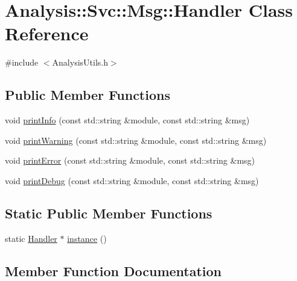 \hypertarget{classAnalysis_1_1Svc_1_1Msg_1_1Handler}{}\section{Analysis\+:\+:Svc\+:\+:Msg\+:\+:Handler Class Reference}
\label{classAnalysis_1_1Svc_1_1Msg_1_1Handler}


{\ttfamily \#include $<$Analysis\+Utils.\+h$>$}

\subsection*{Public Member Functions}
\begin{DoxyCompactItemize}
\item 
void \hyperlink{classAnalysis_1_1Svc_1_1Msg_1_1Handler_aea8aa6f9976b2c76e38afcfc5d1181cf}{print\+Info} (const std\+::string \&module, const std\+::string \&msg)
\item 
void \hyperlink{classAnalysis_1_1Svc_1_1Msg_1_1Handler_a4943dea3cf30fba1d6fcbc1b2cccd488}{print\+Warning} (const std\+::string \&module, const std\+::string \&msg)
\item 
void \hyperlink{classAnalysis_1_1Svc_1_1Msg_1_1Handler_a81a3d00ba9162b45f494218c49f2d354}{print\+Error} (const std\+::string \&module, const std\+::string \&msg)
\item 
void \hyperlink{classAnalysis_1_1Svc_1_1Msg_1_1Handler_a90dbb23013b497eabc605523e1479500}{print\+Debug} (const std\+::string \&module, const std\+::string \&msg)
\end{DoxyCompactItemize}
\subsection*{Static Public Member Functions}
\begin{DoxyCompactItemize}
\item 
static \hyperlink{classAnalysis_1_1Svc_1_1Msg_1_1Handler}{Handler} $\ast$ \hyperlink{classAnalysis_1_1Svc_1_1Msg_1_1Handler_a6c3a2dbccbdc8f9200861fbb7c6adbca}{instance} ()
\end{DoxyCompactItemize}


\subsection{Member Function Documentation}

